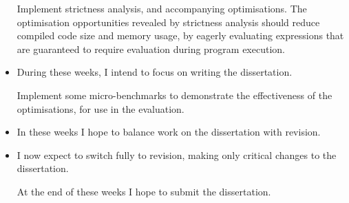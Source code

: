\documentclass[12pt]{article}
\begin{document}
\begin{itemize}
{    Implement strictness analysis, and accompanying optimisations. The optimisation opportunities revealed by
    strictness analysis should reduce compiled code size and memory usage, by eagerly evaluating expressions that are
    guaranteed to require evaluation during program execution.
}
\item
{

    During these weeks, I intend to focus on writing the dissertation.

    Implement some micro-benchmarks to demonstrate the effectiveness of the optimisations, for use in the evaluation.
}
\item
{

    In these weeks I hope to balance work on the dissertation with revision.
}
\item
{

    I now expect to switch fully to revision, making only critical changes to the dissertation.

    At the end of these weeks I hope to submit the dissertation.
}
\end{itemize}
\end{document}
